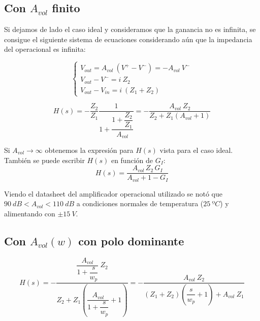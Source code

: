 \subsection{Con $A_{vol}$ finito}
Si dejamos de lado el caso ideal y consideramos que la ganancia no es infinita, se consigue el siguiente sistema de ecuaciones considerando aún que la impedancia del operacional es infinita:

\begin{equation}
\begin{cases}
V_{out} = A_{vol} \ (V^+ - V^-) = - A_{vol} \ V^- \\ V_{out} - V^- = i \ Z_2 \\ V_{out} - V_{in} = i \ (Z_1+Z_2) 
\end{cases} 
\end{equation}

\begin{equation}
H(s) = - \dfrac{Z_2}{Z_1} \dfrac{1}{1+\dfrac{1+\dfrac{Z_2}{Z_1}}{A_{vol}}}
= -
\dfrac{A_{vol} \ Z_2}{Z_2 + Z_1 (A_{vol} +1)}
\end{equation}

Si $A_{vol} \longrightarrow \infty$ obtenemos la expresión para $H(s)$ vista para el caso ideal.
También se puede escribir $H(s)$ en función de $G_I$:
\begin{equation}
H(s) = \dfrac{A_{vol} \, Z_2 \, G_I}{A_{vol} + 1 - G_I} 
\end{equation}

Viendo el datasheet del amplificador operacional utilizado se notó que $90 \ dB< A_{vol} < 110 \ dB$ a condiciones normales de temperatura ($25 \ ºC$) y alimentando con $\pm 15 \ V$.

\subsection{Con $A_{vol}(w)$ con polo dominante}
\begin{equation}
H(s) = - \dfrac{\dfrac{A_{vol}}{1+\dfrac{s}{w_p}} \ Z_2}{Z_2 + Z_1 \left(\dfrac{A_{vol}}{1+\dfrac{s}{w_p}} +1 \right)} 
=
-\dfrac{A_{vol} \ Z_2}{(Z_1+Z_2) \left(\dfrac{s}{w_p}+1 \right)+ A_{vol} \ Z_1}
\end{equation}


